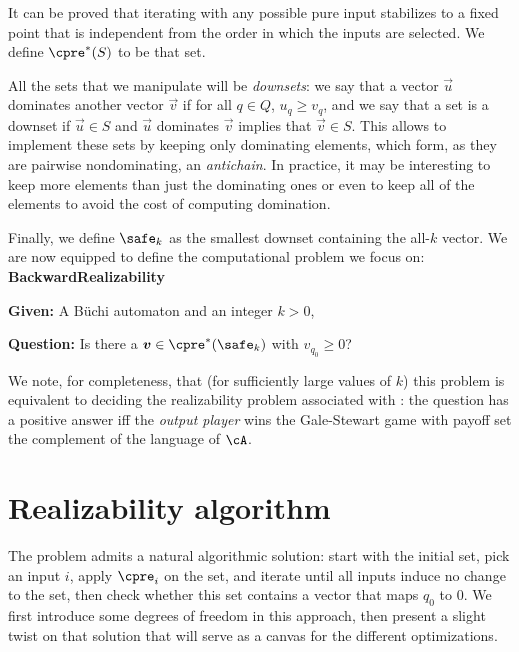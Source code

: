 \documentclass[runningheads,a4paper,draft]{llncs}
\begin{document}
It can be proved that iterating \cpre with any possible pure input stabilizes to
a fixed point that is independent from the order in which the inputs are
selected.  We define \(\cpre^*(S)\) to be that set.

All the sets that we manipulate will be \emph{downsets}: we say that a vector
\(\vec{u}\) dominates another vector \(\vec{v}\) if for all \(q \in Q\),
\(u_q \geq v_q\), and we say that a set is a downset if \(\vec{u} \in S\) and
\(\vec{u}\) dominates \(\vec{v}\) implies that \(\vec{v} \in S\).  This allows to
implement these sets by keeping only dominating elements, which form, as they
are pairwise nondominating, an \emph{antichain}.  In practice, it may be
interesting to keep more elements than just the dominating ones or even to keep
all of the elements to avoid the cost of computing domination.

Finally, we define \(\safe_k\) as the smallest downset containing the all-\(k\)
vector.
We are now equipped to define the computational problem we focus on:\\[1em]
\textbf{BackwardRealizability}
\begin{compactitem}
\item \textbf{Given:} A Büchi automaton \cA and an integer \(k > 0\),
\item \textbf{Question:} Is there a \(\vec{v} \in \cpre^*(\safe_k)\) with \(v_{q_0} \geq
  0\)?
\end{compactitem}
\vspace{1em}

We note, for completeness, that (for sufficiently large values of $k$) this
problem is equivalent to deciding the realizability problem associated with
\cA: the question has a positive answer iff the \emph{output player} wins the
Gale-Stewart game with payoff set the complement of the language of \(\cA\).

\section{Realizability algorithm}

The problem 
admits a natural algorithmic solution: start with the initial
set, pick an input \(i\), apply \(\cpre_i\) on the set, and iterate until all inputs
induce no change to the set, then check whether this set contains a vector that
maps \(q_0\) to \(0\).  We first introduce some degrees of freedom in this approach,
then present a slight twist on that solution that will serve as a canvas for the
different optimizations.
\end{document}
